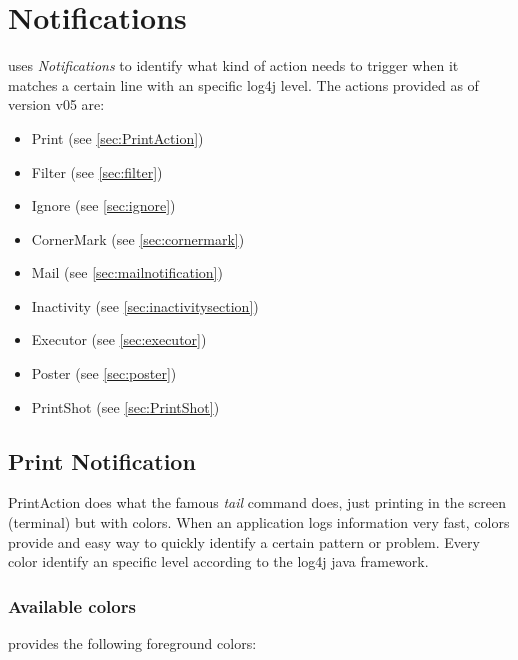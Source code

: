 \section{Notifications}
\logftailer{} uses \emph{Notifications} to identify what kind of action needs to
trigger when it matches a certain line with an specific log4j level. The actions
provided as of version v05 are:
\begin{itemize}
 \item Print (see \autoref{sec:PrintAction})
 \item Filter (see \autoref{sec:filter})
 \item Ignore (see \autoref{sec:ignore})
 \item CornerMark (see \autoref{sec:cornermark})
 \item Mail (see \autoref{sec:mailnotification})
 \item Inactivity (see \autoref{sec:inactivitysection})
 \item Executor (see \autoref{sec:executor})
 \item Poster (see \autoref{sec:poster})
 \item PrintShot (see \autoref{sec:PrintShot})
\end{itemize}

\subsection{Print Notification}
\label{sec:PrintAction}
PrintAction does what the famous \emph{tail} command does, just printing in the
screen (terminal) but with colors. When an application logs information very
fast, colors provide and easy way to quickly identify a certain pattern or
problem. Every color identify an specific level according to the log4j java
framework.

\subsubsection{Available colors}
\label{sec:availablecolors}
\logftailer{} provides the following foreground colors:

